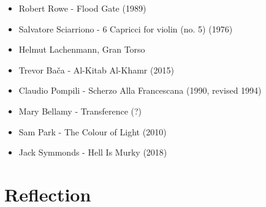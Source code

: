 \begin{itemize}
    \item Robert Rowe - Flood Gate (1989)
    \item Salvatore Sciarriono - 6 Capricci for violin (no. 5) (1976) 
    \item Helmut Lachenmann, Gran Torso
    \item Trevor Bača - Al-Kitab Al-Khamr (2015)
    \item Claudio Pompili - Scherzo Alla Francescana (1990, revised 1994)
    \item Mary Bellamy - Transference (?)
    \item Sam Park - The Colour of Light (2010)
    \item Jack Symmonds - Hell Is Murky (2018)
\end{itemize}

\section{Reflection}




\lipsum[4]